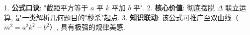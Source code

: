 \begin{summarybox}
1. \textbf{公式口诀}: "截距平方等于 $a$ 平 $k$ 平加 $b$ 平".
2. \textbf{核心价值}: 彻底摆脱 $\Delta$ 联立运算, 是一类解析几何题目的"秒杀"起点.
3. \textbf{知识联动}: 该公式可推广至双曲线（$m^2 = a^2k^2 - b^2$）, 具有极强的规律美感.
\end{summarybox}